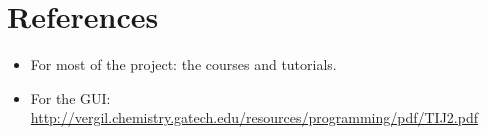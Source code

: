 \section{References}
\label{references}
\begin{itemize}
	\item For most of the project: the courses and tutorials.
	\item For the GUI:
\url{http://vergil.chemistry.gatech.edu/resources/programming/pdf/TIJ2.pdf}
\end{itemize}


